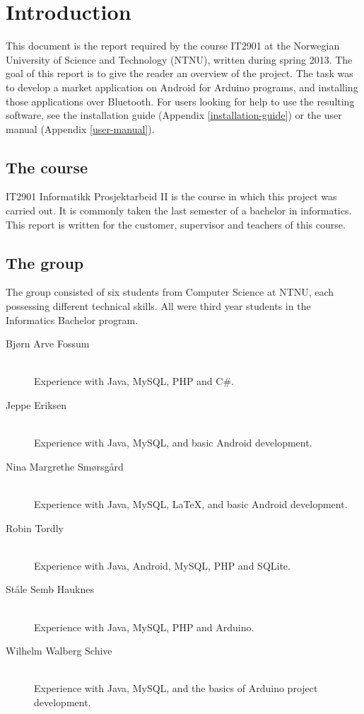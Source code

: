 \chapter{Introduction}

This document is the report required by the course IT2901 at the Norwegian University of Science and Technology (NTNU), written during spring 2013. The goal of this report is to give the reader an overview of the project.
The task was to develop a market application on Android for Arduino programs, and installing those applications over Bluetooth. For users looking for help to use the resulting software, see the installation guide (Appendix \ref{installation-guide}) or the user manual (Appendix \ref{user-manual}).

\section{The course}
IT2901 Informatikk Prosjektarbeid II is the course in which this project was carried out. It is commonly taken the last semester of a bachelor in informatics. This report is written for the customer, supervisor and teachers of this course.

\section{The group}
The group consisted of six students from Computer Science at NTNU, each possessing different technical skills. All were third year students in the Informatics Bachelor program.

\begin{description}
	\item[Bjørn Arve Fossum]\hfill \\
		Experience with Java, MySQL, PHP and C\#.
	\item[Jeppe Eriksen]\hfill \\
		Experience with Java, MySQL, and basic Android development.
	\item[Nina Margrethe Smørsgård]\hfill \\
		Experience with Java, MySQL, \LaTeX, and basic Android development.
	\item[Robin Tordly]\hfill \\
		Experience with Java, Android, MySQL, PHP and SQLite.
	\item[Ståle Semb Hauknes]\hfill \\
		Experience with Java, MySQL, PHP and Arduino.
	\item[Wilhelm Walberg Schive]\hfill \\
		Experience with Java, MySQL, and the basics of Arduino project development.
\end{description}

